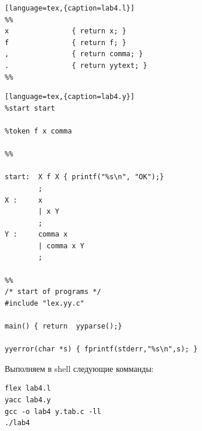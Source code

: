 \documentclass[a4paper,12pt]{article}
\begin{document}
\begin{lstlisting}[language=tex,{caption=lab4.l}]
%%
x               { return x; }
f               { return f; }
,               { return comma; }
.               { return yytext; }
%%
\end{lstlisting}

\begin{lstlisting}[language=tex,{caption=lab4.y}]
%start start

%token f x comma

%%

start:  X f X { printf("%s\n", "OK");}
        ;
X :     x
        | x Y
        ;
Y :     comma x
        | comma x Y
        ;

%%
/* start of programs */
#include "lex.yy.c"

main() { return  yyparse();}

yyerror(char *s) { fprintf(stderr,"%s\n",s); }
\end{lstlisting}

Выполняем в shell следующие комманды:
\begin{verbatim}
flex lab4.l
yacc lab4.y
gcc -o lab4 y.tab.c -ll
./lab4
\end{verbatim}
\end{document}
